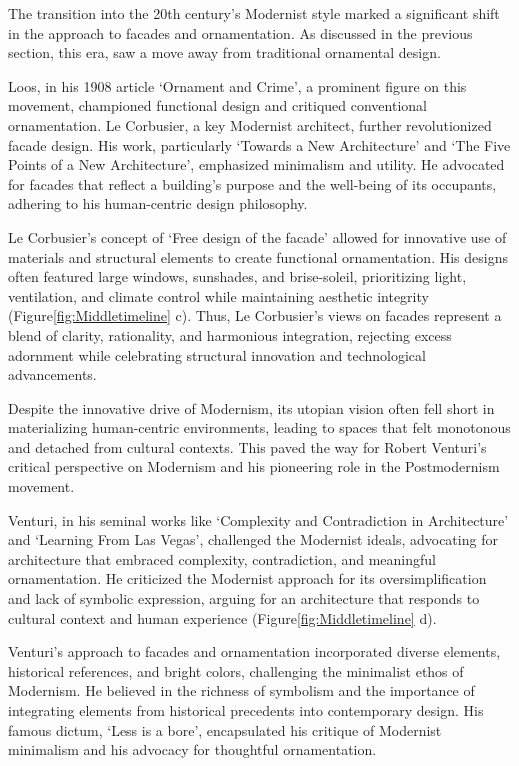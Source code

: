 
The transition into the 20th century's Modernist style marked a significant shift in the approach to facades and ornamentation.
As discussed in the previous section, this era, saw a move away from traditional ornamental design.

Loos, in his 1908 article `Ornament and Crime', a prominent figure on this movement, championed functional design and critiqued conventional ornamentation\cite{Saglam2014}.
Le Corbusier, a key Modernist architect, further revolutionized facade design.
His work, particularly `Towards a New Architecture'\cite{Studio2a2023} and `The Five Points of a New Architecture', emphasized minimalism and utility.
He advocated for facades that reflect a building's purpose and the well-being of its occupants, adhering to his human-centric design philosophy\cite{Virseda2021}.

Le Corbusier's concept of `Free design of the facade'\cite{Corbusier1986} allowed for innovative use of materials and structural elements to create functional ornamentation.
His designs often featured large windows, sunshades, and brise-soleil, prioritizing light, ventilation, and climate control while maintaining aesthetic integrity (Figure\ref{fig:Middletimeline} c).
Thus, Le Corbusier's views on facades represent a blend of clarity, rationality, and harmonious integration, rejecting excess adornment while celebrating structural innovation and technological advancements.


Despite the innovative drive of Modernism, its utopian vision often fell short in materializing human-centric environments, leading to spaces that felt monotonous and detached from cultural contexts.
This paved the way for Robert Venturi's critical perspective on Modernism and his pioneering role in the Postmodernism movement.

Venturi, in his seminal works like `Complexity and Contradiction in Architecture' and `Learning From Las Vegas', challenged the Modernist ideals, advocating for architecture that embraced complexity, contradiction, and meaningful ornamentation\cite{Venturi1977}.
He criticized the Modernist approach for its oversimplification and lack of symbolic expression, arguing for an architecture that responds to cultural context and human experience (Figure\ref{fig:Middletimeline} d).

Venturi's approach to facades and ornamentation incorporated diverse elements, historical references, and bright colors, challenging the minimalist ethos of Modernism.
He believed in the richness of symbolism and the importance of integrating elements from historical precedents into contemporary design\cite{Venturi1971}.
His famous dictum, `Less is a bore', encapsulated his critique of Modernist minimalism and his advocacy for thoughtful ornamentation.

